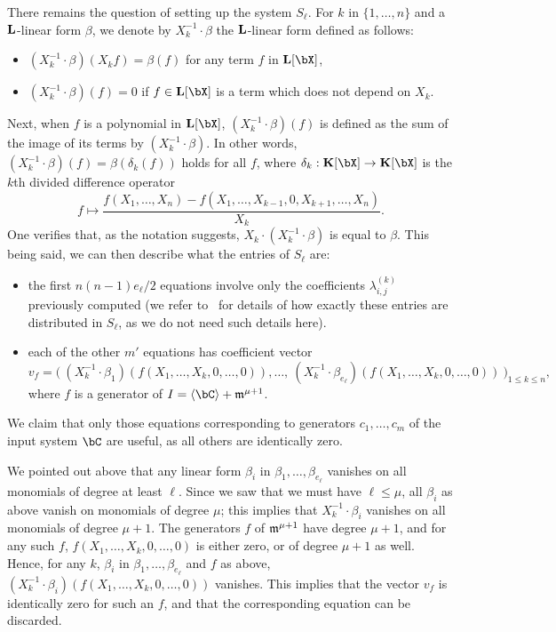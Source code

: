 \documentclass[12pt]{article}
\begin{document}
There remains the question of setting up the system $S_\ell$. For $k$
in $\{1,\dots,n\}$ and a $\mathbf{L}$-linear form $\beta$, we denote by
$X_k^{-1} \cdot \beta$ the $\mathbf{L}$-linear form defined as follows:
\begin{itemize}
\item $(X_k^{-1} \cdot \beta)(X_k f) = \beta(f)$ for any term $f$ in $\LL[\bX]$,
\item $(X_k^{-1} \cdot \beta)(f)=0$ if $f\in \LL[\bX]$ is a term which does not depend on $X_k$.
\end{itemize}
Next, when $f$ is a polynomial in $\LL[\bX]$,
$(X_k^{-1} \cdot \beta)(f)$ is defined as the sum of the image of its
terms by $(X_k^{-1} \cdot \beta)$.  In other words,
$(X_k^{-1} \cdot \beta)(f)=\beta(\delta_k(f))$ holds for all $f$,
where $\delta_k:\KK[\bX] \to \KK[\bX]$ is the $k$th divided difference
operator
$$f\mapsto \frac
{f(X_1,\dots,X_n)-f(X_1,\dots,X_{k-1},0,X_{k+1},\dots,X_n)}{X_k}.$$
One verifies that, as the notation suggests, $X_k \cdot (X_k^{-1}
\cdot \beta)$ is equal to $\beta$. This being said, we can then
describe what the entries of $S_\ell$ are:
\begin{itemize}
\item the first $n(n-1) e_\ell/2$ equations involve only the coefficients 
  $\lambda^{(k)}_{i,j}$ previously computed (we refer to~\cite[Section~4.4]{Mourrain97} for details of how exactly 
these entries are distributed in $S_\ell$, as we do not need such details here).
\item each of the other $m'$ equations has coefficient vector
$$v_f = \big (\
 (X_k^{-1} \cdot \beta_1)(f(X_1,\dots,X_k,0,\dots,0)),\dots,\ (X_k^{-1} \cdot \beta_{e_\ell})(f(X_1,\dots,X_k,0,\dots,0))\
\big )_{1 \le k \le n},$$
where $f$ is a generator of $I=\langle \bC \rangle +\m^{\mu+1}$.
\end{itemize}
We claim that only those equations corresponding to generators
$c_1,\dots,c_m$ of the input system $\bC$ are useful, as all others are identically
zero.

We pointed out above that any linear form $\beta_i$ in
$\beta_1,\dots,\beta_{e_\ell}$ vanishes on all monomials of degree at
least $\ell$. Since we saw that we must have $\ell \le \mu$, all
$\beta_i$ as above vanish on monomials of degree $\mu$; this implies
that $X_k^{-1}\cdot \beta_i$ vanishes on all monomials of degree
$\mu+1$. The generators $f$ of $\mathfrak{m}^{\mu+1}$ have degree $\mu+1$, and
for any such $f$, $f(X_1,\dots,X_k,0,\dots,0)$ is either zero, or of
degree $\mu+1$ as well. Hence, for any $k$, $\beta_i$ in
$\beta_1,\dots,\beta_{e_\ell}$ and $f$ as above, $(X_k^{-1} \cdot
\beta_i)(f(X_1,\dots,X_k,0,\dots,0))$ vanishes. This implies that the
vector $v_f$ is identically zero for such an $f$, and that the
corresponding equation can be discarded.
\end{document}
